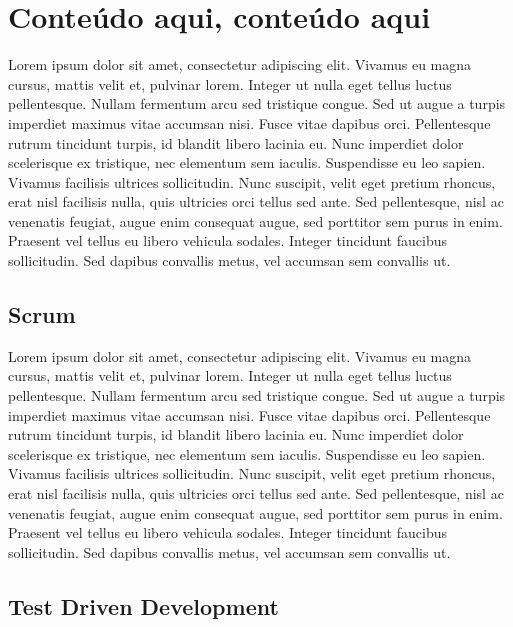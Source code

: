\section{Conteúdo aqui, conteúdo aqui}
\label{sec:android}

Lorem ipsum dolor sit amet, consectetur adipiscing elit. Vivamus eu magna cursus, mattis velit et, pulvinar lorem. Integer ut nulla eget tellus luctus pellentesque. Nullam fermentum arcu sed tristique congue. Sed ut augue a turpis imperdiet maximus vitae accumsan nisi. Fusce vitae dapibus orci. Pellentesque rutrum tincidunt turpis, id blandit libero lacinia eu. Nunc imperdiet dolor scelerisque ex tristique, nec elementum sem iaculis. Suspendisse eu leo sapien. Vivamus facilisis ultrices sollicitudin. Nunc suscipit, velit eget pretium rhoncus, erat nisl facilisis nulla, quis ultricies orci tellus sed ante. Sed pellentesque, nisl ac venenatis feugiat, augue enim consequat augue, sed porttitor sem purus in enim. Praesent vel tellus eu libero vehicula sodales. Integer tincidunt faucibus sollicitudin. Sed dapibus convallis metus, vel accumsan sem convallis ut.

\subsection{Scrum}

Lorem ipsum dolor sit amet, consectetur adipiscing elit. Vivamus eu magna cursus, mattis velit et, pulvinar lorem. Integer ut nulla eget tellus luctus pellentesque. Nullam fermentum arcu sed tristique congue. Sed ut augue a turpis imperdiet maximus vitae accumsan nisi. Fusce vitae dapibus orci. Pellentesque rutrum tincidunt turpis, id blandit libero lacinia eu. Nunc imperdiet dolor scelerisque ex tristique, nec elementum sem iaculis. Suspendisse eu leo sapien. Vivamus facilisis ultrices sollicitudin. Nunc suscipit, velit eget pretium rhoncus, erat nisl facilisis nulla, quis ultricies orci tellus sed ante. Sed pellentesque, nisl ac venenatis feugiat, augue enim consequat augue, sed porttitor sem purus in enim. Praesent vel tellus eu libero vehicula sodales. Integer tincidunt faucibus sollicitudin. Sed dapibus convallis metus, vel accumsan sem convallis ut.

\subsection{Test Driven Development}

